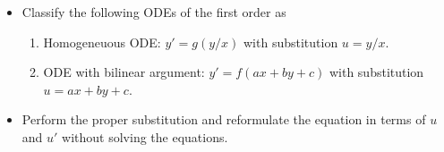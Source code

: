 {
\begin{itemize}
\item[\textbf{1)}] Classify the following ODEs of the first order as
\begin{enumerate}
\item Homogeneuous ODE: $y'=g(y/x)$ with substitution $u=y/x$.
\item ODE with bilinear argument: $y'=f(ax+by+c)$ with substitution $u=ax+by+c$.
\end{enumerate}
\begin{multicols}{2}
\end{multicols}
\item[\textbf{2)}]  Perform the proper substitution and reformulate the equation in terms of $u$ and $u'$ without solving the equations.
\end{itemize}
}



